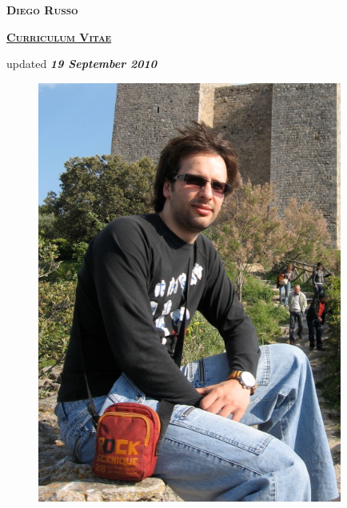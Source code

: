 \documentclass[totpages,helvetica,openbib,english]{europecv}
\begin{document}
    \begin{center}
        \hspace{1pt}
        \vspace{2cm}
    
        {\scshape \textbf{\Huge Diego Russo}}
    
        \vspace{1cm}
    
        {\scshape \textbf{\large \underline{Curriculum Vitae}}}
    
        \vspace{0.25cm}
    
        updated \emph{\textbf{19 September 2010}}
        
        \vspace{2cm}
        
        \begin{figure}[htbp] 
            \begin{center} 
                \includegraphics[width=10cm]{io.jpg}
            \end{center} 
        \end{figure}
        
    \end{center}
\pagebreak
{}
\end{document}
